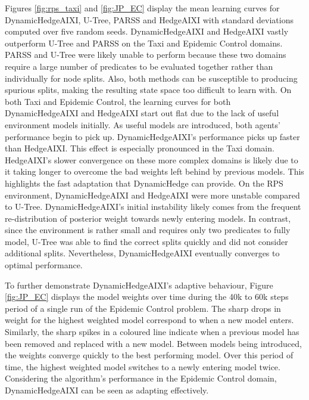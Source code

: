 \documentclass[letterpaper]{article} %
\theoremstyle{definition}
\begin{document}
Figures \ref{fig:rps_taxi} and \ref{fig:JP_EC} display the mean learning curves for DynamicHedgeAIXI, U-Tree, 
PARSS and HedgeAIXI with standard deviations computed over five random seeds. DynamicHedgeAIXI and HedgeAIXI vastly outperform U-Tree and PARSS on the Taxi and Epidemic Control domains. 
PARSS and U-Tree were likely unable to perform because these two domains require a large number of predicates to be 
evaluated together rather than individually for node splits. Also, both methods can be susceptible to producing spurious splits, making the resulting state space too difficult to learn with.
On both Taxi and Epidemic Control, the learning curves for both DynamicHedgeAIXI and HedgeAIXI start out flat due to the lack of 
useful environment models initially. As useful models are introduced, both agents' performance begin to pick up. 
DynamicHedgeAIXI's performance picks up faster than HedgeAIXI. This effect is especially pronounced in the Taxi domain. 
HedgeAIXI's slower convergence on these more complex domains is likely due to it taking longer to overcome the bad weights 
left behind by previous models. This highlights the fast adaptation that DynamicHedge can provide.
On the RPS environment, DynamicHedgeAIXI and HedgeAIXI were more unstable compared to U-Tree.
DynamicHedgeAIXI's initial instability likely comes from the frequent re-distribution of posterior weight towards newly entering models. 
In contrast, since the environment is rather small and requires only two predicates to fully model, U-Tree was able to find the correct splits quickly and did not consider additional splits.
Nevertheless, DynamicHedgeAIXI eventually 
converges to optimal performance.

To further demonstrate DynamicHedgeAIXI's adaptive behaviour, Figure \ref{fig:JP_EC} displays the model weights over time during the 40k to 60k steps period of a single run of the Epidemic Control problem. The sharp drops in weight for the highest weighted model correspond to when a new model enters. Similarly, the sharp spikes in a coloured line indicate when a previous model has been removed and replaced with a new model. Between models being introduced, the weights converge quickly to the best performing model. Over this period of time, the highest weighted model switches to a newly entering model twice. 
Considering the algorithm's performance in the Epidemic Control domain, DynamicHedgeAIXI can be seen as adapting effectively. 
\end{document}
